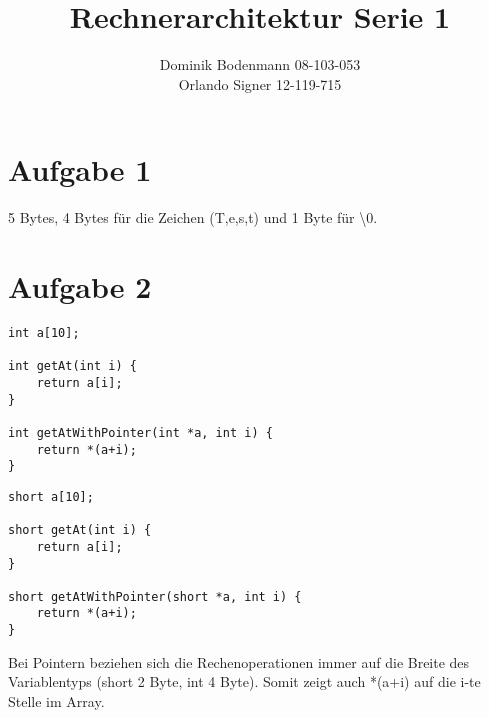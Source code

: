 \documentclass[a4paper,abstracton]{scrartcl}
\title{Rechnerarchitektur Serie 1}
\author{Dominik Bodenmann 08-103-053\\
	Orlando Signer 12-119-715\\}
\begin{document}
\maketitle

\section{Aufgabe 1}
5 Bytes, 4 Bytes für die Zeichen (T,e,s,t) und 1 Byte für \textbackslash0.

\section{Aufgabe 2}
\begin{lstlisting}[caption=int-Array]
int a[10];

int getAt(int i) {
	return a[i];
}

int getAtWithPointer(int *a, int i) {
	return *(a+i);
}
\end{lstlisting}

\begin{lstlisting}[caption=short-Array]
short a[10];

short getAt(int i) {
	return a[i];
}

short getAtWithPointer(short *a, int i) {
	return *(a+i);
}
\end{lstlisting}
Bei Pointern beziehen sich die Rechenoperationen immer auf die Breite des Variablentyps (short 2 Byte, int 4 Byte). Somit zeigt auch *(a+i) auf die i-te Stelle im Array.
\end{document}
